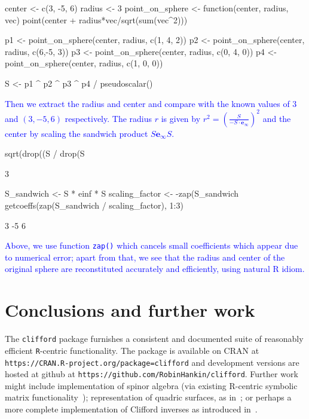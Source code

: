 \documentclass{birkjour}
\theoremstyle{definition}
\theoremstyle{remark}
\numberwithin{equation}{section}
\newcommand{\einf}{\mathbf{e}_\infty}
\begin{document}
%
\begin{Schunk}
\begin{Sinput}
center <- c(3, -5, 6)
radius <- 3
point_on_sphere  <- function(center, radius, vec){
  point(center + radius*vec/sqrt(sum(vec^2)))
}

p1 <- point_on_sphere(center, radius, c(1, 4, 2))
p2 <- point_on_sphere(center, radius, c(6,-5, 3))
p3 <- point_on_sphere(center, radius, c(0, 4, 0))
p4 <- point_on_sphere(center, radius, c(1, 0, 0))

S <- p1 ^ p2 ^ p3 ^ p4 / pseudoscalar()            
\end{Sinput}
\end{Schunk}
%
\textcolor{blue}{
Then we extract the radius and center and compare with the known
values of $3$ and $(3,-5,6)$ respectively.  The radius $r$ is given by
$r^2 = \left(\frac{S}{-S\cdot\einf}\right)^2$ and the center by
scaling the sandwich product $S\einf S$.}

\begin{Schunk}
\begin{Sinput}
sqrt(drop((S / drop(S %
\end{Sinput}
\begin{Soutput}
[1]  3
\end{Soutput}
\begin{Sinput}
S_sandwich <- S * einf * S 
scaling_factor <- -zap(S_sandwich %
getcoeffs(zap(S_sandwich / scaling_factor), 1:3)
\end{Sinput}
\begin{Soutput}
[1]  3 -5 6
\end{Soutput}
\end{Schunk}
%
\textcolor{blue}{
Above, we use function {\tt zap()} which cancels small coefficients
which appear due to numerical error; apart from that, we see that the
radius and center of the original sphere are reconstituted accurately
and efficiently, using natural R idiom.}

\section{Conclusions and further work}

The {\tt clifford} package furnishes a consistent and documented suite
of reasonably efficient {\tt R}-centric functionality.  The package is
available on CRAN at
\verb+https://CRAN.R-project.org/package=clifford+ and development
versions are hosted at github at
\verb+https://github.com/RobinHankin/clifford+.  Further work might
include implementation of spinor algebra (via existing R-centric
symbolic matrix
functionality~\cite{hankin2023_jordan,hankin2006_onion});
representation of quadric surfaces, as in~\cite{breuils2018}; or
perhaps a more complete implementation of Clifford inverses as
introduced in~\cite{hitzer2017}.
\end{document}
